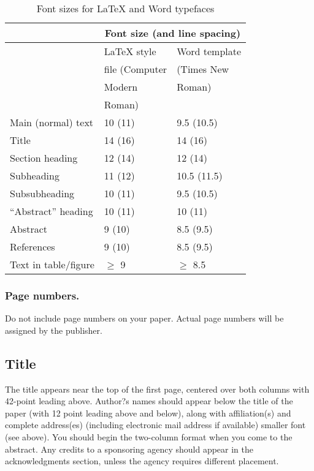 \documentclass[letterpaper]{article}
\begin{document}
\begin{table} [h]
\begin{tabular}{| l | l | l |}
  \hline			
  & \multicolumn{2}{|c|}{Font size (and line spacing)} \\  
  \hline			
						& LaTeX style   	&  Word template \\
						& file (Computer 	& (Times New \\
						& Modern 		  	& Roman)\\   
						& Roman)  			& 		\\   
  \hline
   Main (normal) text 	& 10 (11) 			& 9.5 (10.5) \\
  \hline
   Title				& 14 (16)			& 14 (16) \\
  \hline
  Section heading		& 12 (14)			& 12 (14) \\
  \hline
  Subheading			& 11 (12)			& 10.5 (11.5) \\
  \hline  
  Subsubheading			& 10 (11)			& 9.5 (10.5) \\
  \hline  
  ``Abstract'' heading	& 10 (11)			& 10 (11) \\
  \hline  
  Abstract				& 9 (10)			& 8.5 (9.5) \\
  \hline  
  References			& 9 (10)			& 8.5 (9.5) \\
  \hline  
  Text in table/figure	& $\geq$ 9			& $\geq$ 8.5 \\
  \hline    
\end{tabular}
\caption{Font sizes for LaTeX and Word typefaces}
\end{table}

\subsubsection{Page numbers.} 
Do not include page numbers on your paper. Actual page 
numbers will be assigned by the publisher.


\subsection{Title}
The title appears near the top of the first page, 
centered over both columns with 42-point leading above. 
Author?s names should appear below the title of the paper 
(with 12 point leading above and below), along with affiliation(s) 
and complete address(es) (including electronic mail address if available) 
smaller font (see above). You should begin the two-column 
format when you come to the abstract. Any credits to a sponsoring 
agency should appear in the acknowledgments section, unless the agency 
requires different placement.
\end{document}
